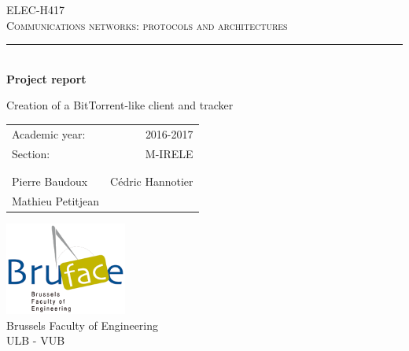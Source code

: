 \setlength{\parindent}{0cm}
\setlength{\parskip}{1ex plus 0.5ex minus 0.2ex}
\newcommand{\hsp}{\hspace{20pt}}
\newcommand{\HRule}{\rule{\linewidth}{0.5mm}}

\begin{titlepage}
  \begin{sffamily}
  \begin{center}

    \textsc{\Large ELEC-H417\\
    Communications networks: protocols and architectures}\\[4.6cm]

    \HRule \\[0.4cm]
    { \huge \bfseries Project report \\[0.4cm] }


{\Large Creation of a BitTorrent-like client and tracker\\[3cm]}
  
\begin{center}
\begin{tabular}{l r}
Academic year: & 2016-2017 \\ %
Section: & M-IRELE\\
& \\ \\
Pierre Baudoux & Cédric Hannotier \\
Mathieu Petitjean
\end{tabular}
\end{center}

    \vfill
    \includegraphics[width=0.3\textwidth]{img/bruface_logo.png}\\[0.1in]
    \Large{Brussels Faculty of Engineering}\\
    \normalsize
    \textsc{ULB - VUB}\\

    \vspace{0.2cm}

  \end{center}
  \end{sffamily}
\end{titlepage}